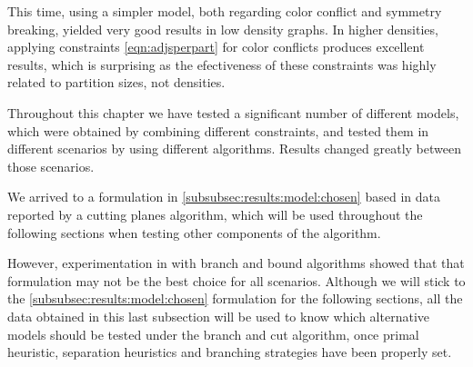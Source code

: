 This time, using a simpler model, both regarding color conflict and symmetry breaking, yielded very good results in low density graphs. In higher densities, applying constraints \ref{eqn:adjsperpart} for color conflicts produces excellent results, which is surprising as the efectiveness of these constraints was highly related to partition sizes, not densities.

\spacedhrule
Throughout this chapter we have tested a significant number of different models, which were obtained by combining different constraints, and tested them in different scenarios by using different algorithms. Results changed greatly between those scenarios.

We arrived to a formulation in \ref{subsubsec:results:model:chosen} based in data reported by a cutting planes algorithm, which will be used throughout the following sections when testing other components of the algorithm. 

However, experimentation in \label{subsec:results:models:bnbtesting} with branch and bound algorithms showed that that formulation may not be the best choice for all scenarios. Although we will stick to the \ref{subsubsec:results:model:chosen} formulation for the following sections, all the data obtained in this last subsection will be used to know which alternative models should be tested under the branch and cut algorithm, once primal heuristic, separation heuristics and branching strategies have been properly set.

\clearpage